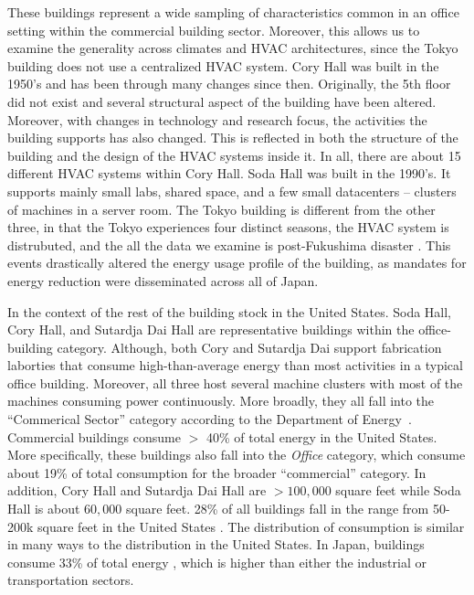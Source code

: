 These buildings represent a wide sampling of characteristics common in an office setting within the commercial building sector.  Moreover,
this allows us to examine the generality across climates and HVAC architectures, since the Tokyo building does not use a centralized
HVAC system.  Cory Hall was built in the 1950's and has been through many changes since then.  Originally, the 5th floor did not exist
and several structural aspect of the building have been altered.  Moreover, with changes in technology and research focus, the activities
the building supports has also changed.  This is reflected in both the structure of the building and the design of the HVAC systems inside it.
In all, there are about 15 different HVAC systems within Cory Hall.  Soda Hall was built in the 1990's.  It supports mainly
small labs, shared space, and a few small datacenters -- clusters of machines in a server room.
The Tokyo building is different from the other three, in that the Tokyo experiences four distinct seasons, the HVAC system is distrubuted,
and the all the data we examine is post-Fukushima disaster \cite{fukushima}.  This events drastically altered the energy usage profile
of the building, as mandates for energy reduction were disseminated across all of Japan.

In the context of the rest of the building stock in the United States.  Soda Hall, Cory Hall, and Sutardja Dai Hall are representative
buildings within the office-building category.  Although, both Cory and Sutardja Dai support fabrication laborties that consume high-than-average
energy than most activities in a typical office building.  Moreover, all three host several machine clusters with most of the machines consuming
power continuously.  More broadly, they all fall into the ``Commerical Sector'' category according to the Department of Energy~\cite{EIA}.
Commercial buildings consume $>$ 40\% of total energy in the United States.  More specifically, these buildings also fall into the \emph{Office} category,
which consume about 19\% of total consumption for the broader ``commercial'' category.  In addition, Cory Hall and Sutardja Dai Hall are $>100,000$
square feet while Soda Hall is about $60,000$ square feet.  28\% of all buildings fall in the range from 50-200k square feet in the 
United States \cite{EIA}.
The distribution of consumption is similar in many ways to the distribution in the United States.  In Japan, buildings consume 33\% of 
total energy \cite{Japan_buildings}, which is higher than either the industrial or transportation sectors.

